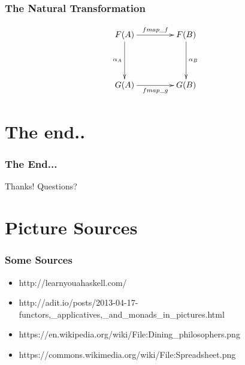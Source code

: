 \documentclass[12pt, xcolor=table]{beamer}
\begin{document}
\begin{frame}
    \frametitle{The Natural Transformation}
    \begin{equation*}
           \xymatrix@C+2em@R+2em{
              F(A) \ar[r]^{fmap\_f} \ar[d]_{\alpha_A} & F(B) \ar[d]^{\alpha_B} \\
              G(A) \ar[r]_{fmap\_g} & G(B)
             }
    \end{equation*}
%
%
%
%
\end{frame}


\section{The end..} %
\begin{frame}
    \frametitle{The End...}
    \begin{block}{Thanks!}
        Questions?
    \end{block}
\end{frame}

\section{Picture Sources}
\begin{frame}
    \frametitle{Some Sources}
    \begin{itemize}
        \item \tiny{http://learnyouahaskell.com/}
        \item \tiny{http://adit.io/posts/2013-04-17-functors,\_applicatives,\_and\_monads\_in\_pictures.html}
        \item \tiny{https://en.wikipedia.org/wiki/File:Dining\_philosophers.png}
        \item \tiny{https://commons.wikimedia.org/wiki/File:Spreadsheet.png}
    \end{itemize}
\end{frame}
\end{document}
